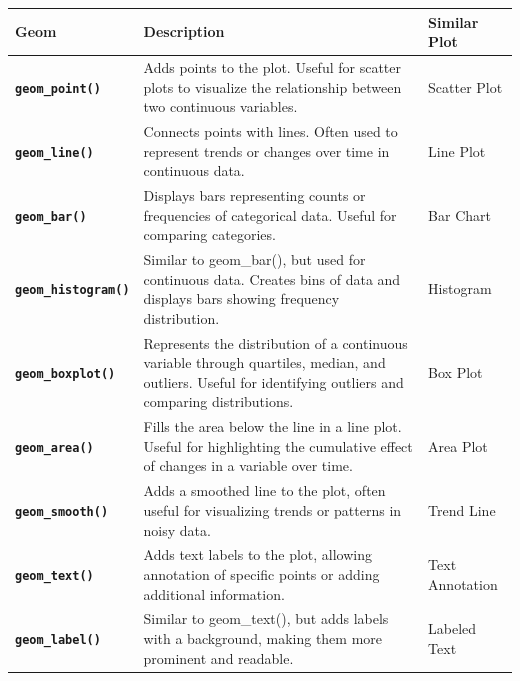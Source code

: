 \documentclass[
]{book}
\begin{document}
\begin{longtable}[]{@{}
  >{\raggedright\arraybackslash}p{}
  >{\raggedright\arraybackslash}p{}
  >{\raggedright\arraybackslash}p{}@{}}
\toprule\noalign{}
\begin{minipage}[b]{\linewidth}\raggedright
\textbf{Geom}
\end{minipage} & \begin{minipage}[b]{\linewidth}\raggedright
\textbf{Description}
\end{minipage} & \begin{minipage}[b]{\linewidth}\raggedright
\textbf{Similar Plot}
\end{minipage} \\
\midrule\noalign{}
\endhead
\bottomrule\noalign{}
\endlastfoot
\textbf{\texttt{geom\_point()}} & Adds points to the plot. Useful for scatter plots to visualize the relationship between two continuous variables. & Scatter Plot \\
\textbf{\texttt{geom\_line()}} & Connects points with lines. Often used to represent trends or changes over time in continuous data. & Line Plot \\
\textbf{\texttt{geom\_bar()}} & Displays bars representing counts or frequencies of categorical data. Useful for comparing categories. & Bar Chart \\
\textbf{\texttt{geom\_histogram()}} & Similar to geom\_bar(), but used for continuous data. Creates bins of data and displays bars showing frequency distribution. & Histogram \\
\textbf{\texttt{geom\_boxplot()}} & Represents the distribution of a continuous variable through quartiles, median, and outliers. Useful for identifying outliers and comparing distributions. & Box Plot \\
\textbf{\texttt{geom\_area()}} & Fills the area below the line in a line plot. Useful for highlighting the cumulative effect of changes in a variable over time. & Area Plot \\
\textbf{\texttt{geom\_smooth()}} & Adds a smoothed line to the plot, often useful for visualizing trends or patterns in noisy data. & Trend Line \\
\textbf{\texttt{geom\_text()}} & Adds text labels to the plot, allowing annotation of specific points or adding additional information. & Text Annotation \\
\textbf{\texttt{geom\_label()}} & Similar to geom\_text(), but adds labels with a background, making them more prominent and readable. & Labeled Text \\

\end{longtable}
\end{document}
